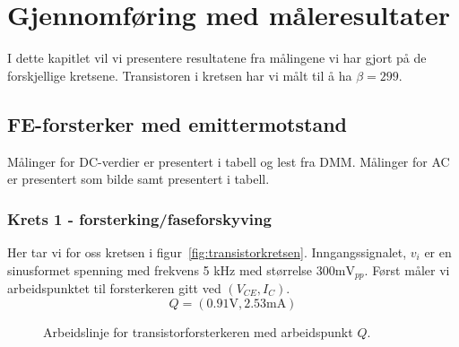 \section{Gjennomføring med måleresultater}
I dette kapitlet vil vi presentere resultatene fra målingene vi har gjort på de forskjellige kretsene. Transistoren i kretsen har vi målt til å ha $\beta = 299$.

\subsection{FE-forsterker med emittermotstand}
Målinger for DC-verdier er presentert i tabell og lest fra DMM. Målinger for AC er presentert som bilde samt presentert i tabell.

\subsubsection{Krets 1 - forsterking/faseforskyving}
Her tar vi for oss kretsen i figur~\ref{fig:transistorkretsen}. Inngangssignalet, $v_i$ er en sinusformet spenning med frekvens 5 kHz med størrelse $300\text{mV}_{pp}$. Først måler vi arbeidspunktet til forsterkeren gitt ved $\left(V_{CE}, I_C\right)$.
\[
Q = \left(0.91\text{V}, 2.53\text{mA}\right)
\]

\begin{figure}[H]
\centering
{}
\caption{Arbeidslinje for transistorforsterkeren med arbeidspunkt $Q$.}
\end{figure}

